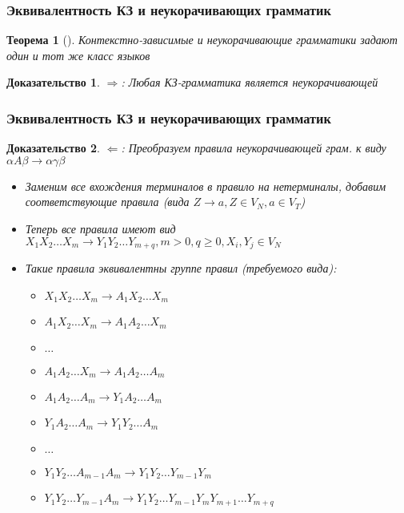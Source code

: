 \documentclass{beamer}
\newtheorem{rutheorem}{Теорема}
\newtheorem{ruproof}{Доказательство}
\begin{document}
\begin{frame}[fragile]
  \transwipe[direction=90]
  \frametitle{Эквивалентность КЗ и неукорачивающих грамматик}
\begin{rutheorem}[]
  Контекстно-зависимые и неукорачивающие грамматики задают один и тот же класс языков
\end{rutheorem}

\begin{ruproof}
$\Rightarrow$: Любая КЗ-грамматика является неукорачивающей
\end{ruproof}

\end{frame}

\begin{frame}[fragile]
  \transwipe[direction=90]
  \frametitle{Эквивалентность КЗ и неукорачивающих грамматик}

\begin{ruproof}
$\Leftarrow$: Преобразуем правила неукорачивающей грам. к виду $\alpha A \beta \rightarrow \alpha \gamma \beta$

\begin{itemize}
  \item Заменим все вхождения терминалов в правило на нетерминалы, добавим соответствующие правила (вида $Z \rightarrow a, Z \in V_N, a \in V_T$)
  \item Теперь все правила имеют вид $X_1 X_2 \dots X_m \rightarrow Y_1 Y_2 \dots Y_{m+q}, m > 0, q \geq 0, X_i, Y_j \in V_N$
  \item Такие правила эквивалентны группе правил (требуемого вида):
  \begin{itemize}
    \item $X_1 X_2 \dots X_m \rightarrow A_1 X_2 \dots X_m$
    \item $A_1 X_2 \dots X_m \rightarrow A_1 A_2 \dots X_m$
    \item $\dots$
    \item $A_1 A_2 \dots X_m \rightarrow A_1 A_2 \dots A_m$
    \item $A_1 A_2 \dots A_m \rightarrow Y_1 A_2 \dots A_m$
    \item $Y_1 A_2 \dots A_m \rightarrow Y_1 Y_2 \dots A_m$
    \item $\dots$
    \item $Y_1 Y_2 \dots A_{m - 1} A_m \rightarrow Y_1 Y_2 \dots Y_{m-1} Y_m$
    \item $Y_1 Y_2 \dots Y_{m - 1} A_m \rightarrow Y_1 Y_2 \dots Y_{m-1} Y_m Y_{m+1} \dots Y_{m+q}$
  \end{itemize}
\end{itemize}
\end{ruproof}

\end{frame}
\end{document}
